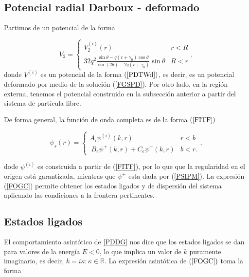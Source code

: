 \subsection{Potencial radial Darboux - deformado}

Partimos de un potencial de la forma 

\begin{equation}
V_2 = 
\begin{cases}
V_2^{(i)}(r) & r < R
\\
32 q^2   \frac{\sin\theta-q(r+\gamma_0)\cos\theta}{\sin(2\theta)-2q(r+\gamma_0)}\sin\theta & R < r \label{PDDG}
\end{cases},
\end{equation}
donde $V^{(i)}$ es un potencial de la forma $(\ref{PDTWd})$, es decir, es un potencial deformado por medio de la solución (\ref{FGSPD}). Por otro  lado, en la región externa, tenemos el potencial construido en la subsección anterior a partir del sistema de partícula libre.


De forma general, la función de onda completa es de la forma $(\ref{FITF})$

\begin{equation}
\psi_s(r)=\begin{cases}
A_i \psi^{(i)}(k,r) & r < b
\\\ B_e \psi^{+}(k,r) + C_e \psi^{-}(k,r) & b < r.
\end{cases},\label{FOGC}
\end{equation}

dode  $\psi^{(i)}$ es construida a partir de (\ref{FITF}), por lo que que la regularidad en el origen está garantizada, mientras que $\psi^{\pm}$ esta dada por (\ref{PSIPM}). La expresión (\ref{FOGC}) permite obtener los estados ligados y de dispersión del sistema aplicando las condiciones a la frontera pertinentes.


\subsection{Estados ligados}

El comportamiento asintótico de  \ref{PDDG} nos dice que los estados ligados se dan para valores de la energía $E < 0$, lo que implica un valor de $k$ puramente imaginario, es decir, $k = i \kappa : \kappa \in \mathbb{R}$. La expresión asintótica de $(\ref{FOGC})$ toma la forma


